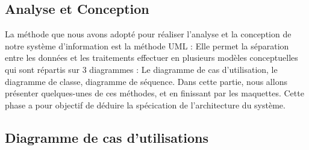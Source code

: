 \documentclass[a4paper]{report}
\begin{document}
\begin{spacing}{2}
\chapter{Analyse et Conception}

\par
La méthode que nous avons adopté pour réaliser l'analyse et la conception de
notre système d'information est la méthode UML : Elle permet la séparation
entre les données et les traitements effectuer en plusieurs modèles conceptuelles
qui sont répartis sur 3 diagrammes : Le diagramme de cas d’utilisation, le 
diagramme de classe, diagramme de séquence. Dans cette partie, nous allons 
présenter quelques-unes de ces méthodes, et en finissant par les maquettes.
Cette phase a pour objectif de déduire la spécication de l'architecture du système.

\section{Diagramme de cas d’utilisations}


\end{spacing}
\end{document}
